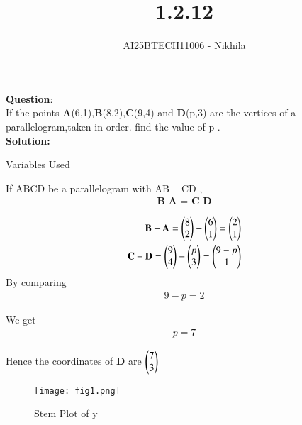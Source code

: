 \documentclass[journal]{IEEEtran}
\begin{document}

\vspace{3cm}

\title{1.2.12}
\author{AI25BTECH11006 - Nikhila}
{\let\newpage\relax\maketitle}


\renewcommand{\thefigure}{\theenumi}
\renewcommand{\thetable}{\theenumi}
\setlength{\intextsep}{10pt} %


\renewcommand{\thetable}{\theenumi}


\textbf{Question}:\\
If the points \textbf{A}(6,1),\textbf{B}(8,2),\textbf{C}(9,4) and \textbf{D}(p,3) are the vertices of a parallelogram,taken in order. find the value of p .
\\
\textbf{Solution: }

 \begin{table}[h!]    
      \centering
      
      \caption{Variables Used}
      \label{}
    \end{table}

 If ABCD be a parallelogram with AB $||$ CD ,
 \begin{align*}
\textbf{B-A $=$ C-D}
\end{align*}


\begin{align}
    \textbf{B}-\textbf{A}=\begin{pmatrix}8 \\ 2\end{pmatrix} -\begin{pmatrix}6 \\ 1\end{pmatrix}=\begin{pmatrix}2 \\ 1\end{pmatrix}\\
    \textbf{C}-\textbf{D}=\begin{pmatrix}9 \\ 4\end{pmatrix} -\begin{pmatrix}p \\ 3\end{pmatrix}=\begin{pmatrix}9-p \\ 1\end{pmatrix} 
\end{align}
By comparing 
\begin{align}
    9-p = 2
\end{align}

We get 
\begin{align}
    p = 7
\end{align}

Hence the coordinates of \textbf{D} are $\begin{pmatrix}7 \\ 3\end{pmatrix}$

\begin{figure}[h!]
   \centering
   \texttt{[image: fig1.png]}
   \caption{Stem Plot of y}
   \label{stemplot}
\end{figure}
\end{document}

